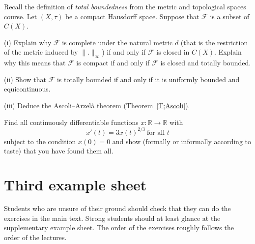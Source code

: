 \begin{exercise}\label{E;alternate Ascoli}\label{C2.11}
Recall the definition of \emph{total boundedness}
from the metric and topological spaces course.
Let $(X,\tau)$ be a compact Hausdorff space.
Suppose  that ${\mathcal F}$ is a subset of $C(X)$.

(i) Explain why  ${\mathcal F}$ is complete
under the natural metric $d$ (that is the restriction of the
metric induced by $\|.\|_{\infty}$) if and only if
${\mathcal F}$ is closed in $C(X)$.
Explain why this means that ${\mathcal F}$
is compact if and only if ${\mathcal F}$
is closed and totally bounded.

(ii) Show that  ${\mathcal F}$
is totally bounded if and only if it
is uniformly bounded and equicontinuous.

(iii) Deduce the Ascoli--Arzel{\`a} theorem (Theorem~\ref{T;Ascoli}).
\end{exercise}
\begin{exercise}\label{C2.12} 
Find all continuously differentiable functions
$x:{\mathbb R}\rightarrow{\mathbb R}$ with
\[x'(t)=3x(t)^{2/3}\ \text{for all $t$}\]
subject to the condition $x(0)=0$ and show 
(formally or informally according to taste) 
that you have found them all.

\end{exercise}
\section{Third example sheet}
Students who are unsure of  their ground should
check that they can do the exercises in the main text. 
Strong students should at least glance at the supplementary
example sheet. The order of the exercises roughly follows the
order of the lectures.


